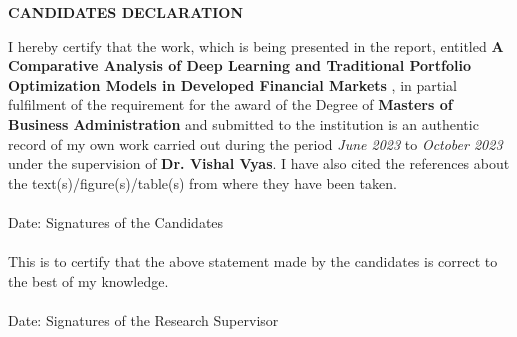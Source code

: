 \newpage
\begin{center}
{\large \bf CANDIDATES DECLARATION}
\end{center}
I hereby certify that the work, which is being presented in the report, entitled {\bf A Comparative Analysis of Deep Learning and Traditional Portfolio Optimization Models in Developed Financial Markets }, in partial fulfilment of the requirement for the award of the
Degree of {\bf Masters of Business Administration} and submitted to the institution is an authentic record of my own work carried out
during the period \emph{June 2023} to \emph{October 2023} under the supervision of {\bf Dr. Vishal Vyas}.
I have also cited the references about the text(s)/figure(s)/table(s) from where they have been taken.\\
\vspace{0.6in} \\
Date: \hspace{3.4in} Signatures of the Candidates \\
\vspace{0.2in} \\
This is to certify that the above statement made by the candidates is correct to the best of my knowledge. \\
\vspace{0.5in} \\
Date: \hspace{2.65in} Signatures of the Research Supervisor \\


